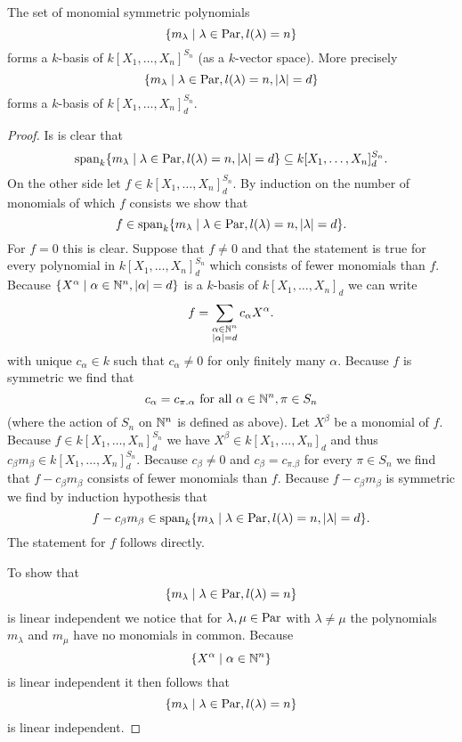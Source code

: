 \begin{lem}
 The set of monomial symmetric polynomials
 \[
  \{m_\lambda \mid \lambda \in \operatorname{Par}, l(\lambda) = n\}
 \]
 forms a $k$-basis of $k[X_1, \ldots, X_n]^{S_n}$ (as a $k$-vector space). More precisely
 \[
  \{m_\lambda \mid \lambda \in \operatorname{Par}, l(\lambda) = n, |\lambda|=d \}
 \]
 forms a $k$-basis of $k[X_1, \ldots, X_n]^{S_n}_d$.
\end{lem}
\begin{proof}
 Is is clear that
 \[
  \operatorname{span}_k \{m_\lambda \mid \lambda \in \operatorname{Par}, l(\lambda) = n, |\lambda|=d \} \subseteq k[X_1, \ldots, X_n]^{S_n}_d.
 \]
 On the other side let $f \in k[X_1, \ldots, X_n]^{S_n}_d$. By induction on the number of monomials of which $f$ consists we show that
 \[
  f \in \operatorname{span}_k \{m_\lambda \mid \lambda \in \operatorname{Par}, l(\lambda) = n, |\lambda|=d\}.
 \]
 For $f = 0$ this is clear. Suppose that $f \neq 0$ and that the statement is true for every polynomial in $k[X_1, \ldots, X_n]^{S_n}_d$ which consists of fewer monomials than $f$. Because $\{X^\alpha \mid \alpha \in \mathbb{N}^n, |\alpha|=d \}$ is a $k$-basis of $k[X_1, \ldots, X_n]_d$ we can write
 \[
  f = \sum_{\substack{\alpha \in \mathbb{N}^n \\ |\alpha|=d}} c_\alpha X^\alpha.
 \]
 with unique $c_\alpha \in k$ such that $c_\alpha \neq 0$ for only finitely many $\alpha$. Because $f$ is symmetric we find that
 \[
  c_\alpha = c_{\pi.\alpha} \text{ for all } \alpha \in \mathbb{N}^n, \pi \in S_n
 \]
 (where the action of $S_n$ on $\mathbb{N}^n$ is defined as above). Let $X^\beta$ be a monomial of $f$. Because $f \in k[X_1, \ldots, X_n]^{S_n}_d$ we have $X^\beta \in k[X_1, \ldots, X_n]_d$ and thus $c_\beta m_\beta \in k[X_1, \ldots, X_n]^{S_n}_d$. Because $c_\beta \neq 0$ and $c_\beta = c_{\pi.\beta}$ for every $\pi \in S_n$ we find that $f-c_{\beta}m_\beta$ consists of fewer monomials than $f$. Because $f-c_{\beta}m_\beta$ is symmetric we find by induction hypothesis that
 \[
  f - c_{\beta}m_\beta \in \operatorname{span}_k \{m_\lambda \mid \lambda \in \operatorname{Par}, l(\lambda) = n, |\lambda|=d\}.
 \]
 The statement for $f$ follows directly.
 
 To show that
 \[
  \{m_\lambda \mid \lambda \in \operatorname{Par}, l(\lambda) = n\}
 \]
 is linear independent we notice that for $\lambda, \mu \in \operatorname{Par}$ with $\lambda \neq \mu$ the polynomials $m_\lambda$ and $m_\mu$ have no monomials in common. Because
 \[
  \{X^\alpha \mid \alpha \in \mathbb{N}^n\}
 \]
 is linear independent it then follows that
 \[
  \{m_\lambda \mid \lambda \in \operatorname{Par}, l(\lambda) = n\}
 \]
 is linear independent.
\end{proof}


